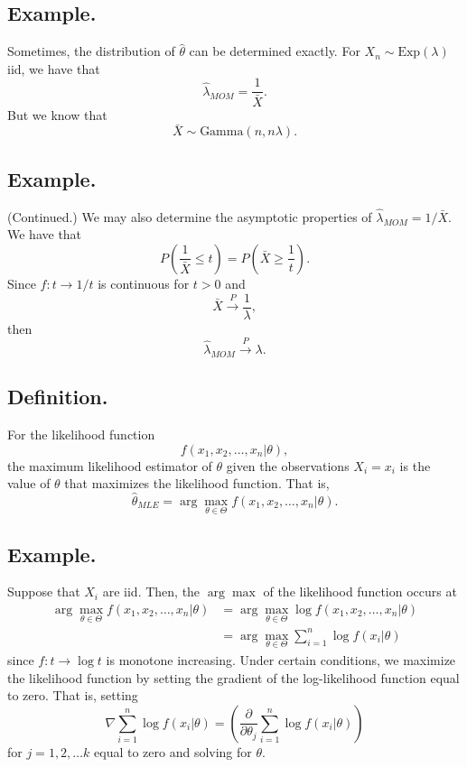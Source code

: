 \documentclass[titlepage]{article}
\begin{document}
\subsection{Example.} Sometimes, the distribution of $\hat{\theta}$ can be determined exactly. For $X_{n} \sim \text{Exp}(\lambda)$ iid, we have that 
$$\hat{\lambda}_{MOM} = \frac{1}{\bar{X}}.$$
But we know that 
$$\bar{X} \sim \text{Gamma}(n, n\lambda).$$

\subsection{Example.} (Continued.) We may also determine the asymptotic properties of $\hat{\lambda}_{MOM} = 1/\bar{X}$. We have that 
$$P\left(\frac{1}{\bar{X}} \leq t\right) = P(\bar{X} \geq \frac{1}{t}).$$
Since $f: t \to 1/t$ is continuous for $t > 0$ and 
$$\bar{X} \xrightarrow{P} \frac{1}{\lambda},$$
then 
$$\hat{\lambda}_{MOM} \xrightarrow{P} \lambda.$$

\subsection{Definition.} For the likelihood function 
$$f(x_{1}, x_{2}, \ldots, x_{n}|\theta),$$
the maximum likelihood estimator of $\theta$ given the observations $X_{i} = x_{i}$ is the value of $\theta$ that maximizes the likelihood function. That is, 
$$\hat{\theta}_{MLE} = \arg\max_{\theta \in \Theta}f(x_{1}, x_{2}, \ldots, x_{n}|\theta).$$

\subsection{Example.} Suppose that $X_{i}$ are iid. Then, the $\arg\max$ of the likelihood function occurs at 
\begin{align*}
    \arg\max_{\theta \in \Theta}f(x_{1}, x_{2}, \ldots, x_{n}|\theta) &= \arg\max_{\theta \in \Theta}\log f(x_{1}, x_{2}, \ldots, x_{n}|\theta) \\
                                                   &= \arg\max_{\theta \in \Theta}\sum_{i=1}^{n}\log f(x_{i}|\theta)
\end{align*}
since $f: t \to \log t$ is monotone increasing. Under certain conditions, we maximize the likelihood function by setting the gradient of the log-likelihood function equal to zero. That is, setting 
$$\nabla \sum_{i=1}^{n}\log f(x_{i}|\theta) = \left(\frac{\partial}{\partial\theta_{j}}\sum_{i=1}^{n}\log f(x_{i}|\theta)\right)$$
for $j = 1, 2, \ldots k$ equal to zero and solving for $\theta$.
\end{document}
